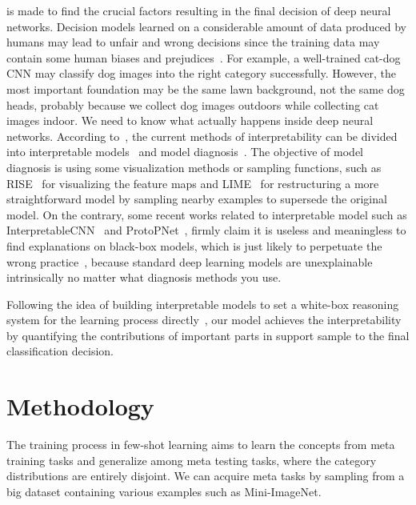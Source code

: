 \documentclass[letterpaper]{article}
\begin{document}
 is made to find the crucial factors resulting in the final decision of deep neural networks. Decision models learned on a considerable amount of data produced by humans may lead to unfair and wrong decisions since the training data may contain some human biases and prejudices~\cite{survey_I-ML}. For example, a well-trained cat-dog CNN may classify dog images into the right category successfully. However, the most important foundation may be the same lawn background, not the same dog heads, probably because we collect dog images outdoors while collecting cat images indoor. We need to know what actually happens inside deep neural networks. According to~\cite{rudin2018please}, the current methods of interpretability can be divided into interpretable models~\cite{Chen2018ThisLL,zhang2018interpretable,wang2017bayesian} and model diagnosis~\cite{selvaraju2017grad,simonyan2013gradient}. The objective of model diagnosis is using some visualization methods or sampling functions, such as RISE~\cite{petsiuk2018rise} for visualizing the feature maps and LIME~\cite{ribeiro2016lime} for restructuring a more straightforward model by sampling nearby examples to supersede the original model. On the contrary, some recent works related to interpretable model such as InterpretableCNN~\cite{zhang2018interpretable} and ProtoPNet~\cite{Chen2018ThisLL}, firmly claim it is useless and meaningless to find explanations on black-box models, which is just likely to perpetuate the wrong practice~\cite{rudin2018please}, because standard deep learning models are unexplainable intrinsically no matter what diagnosis methods you use. 

Following the idea of building interpretable models to set a white-box reasoning system for the learning process directly~\cite{rudin2018please}, our model achieves the interpretability by quantifying the contributions of important parts in support sample to the final classification decision.

\section{Methodology}\label{section: Approach}
The training process in few-shot learning aims to learn the concepts from meta training tasks and generalize among meta testing tasks, where the category distributions are entirely disjoint. We can acquire meta tasks by sampling from a big dataset containing various examples such as Mini-ImageNet.
\end{document}
